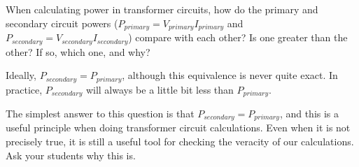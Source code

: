 

When calculating power in transformer circuits, how do the primary and secondary circuit powers ($P_{primary} = V_{primary}I_{primary}$ and $P_{secondary} = V_{secondary}I_{secondary}$) compare with each other?  Is one greater than the other?  If so, which one, and why?







Ideally, $P_{secondary} = P_{primary}$, although this equivalence is never quite exact.  In practice, $P_{secondary}$ will always be a little bit less than $P_{primary}$.







The simplest answer to this question is that $P_{secondary} = P_{primary}$, and this is a useful principle when doing transformer circuit calculations.  Even when it is not precisely true, it is still a useful tool for checking the veracity of our calculations.  Ask your students why this is.




